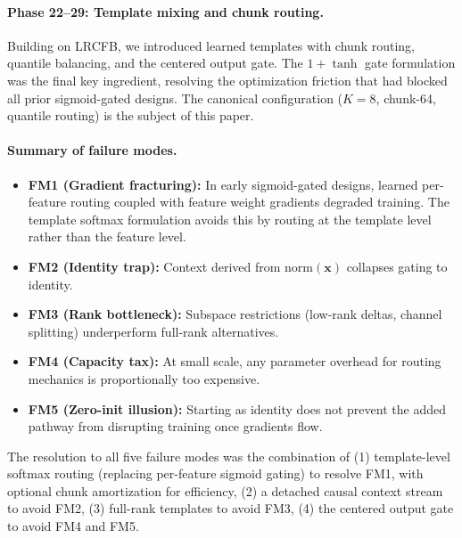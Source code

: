 \documentclass[11pt]{article}
\begin{document}
\paragraph{Phase 22--29: Template mixing and chunk routing.}
Building on LRCFB, we introduced learned templates with chunk routing, quantile balancing, and the centered output gate. The $1 + \tanh$ gate formulation was the final key ingredient, resolving the optimization friction that had blocked all prior sigmoid-gated designs. The canonical configuration ($K{=}8$, chunk-64, quantile routing) is the subject of this paper.

\paragraph{Summary of failure modes.}
\begin{itemize}
\item \textbf{FM1 (Gradient fracturing):} In early sigmoid-gated designs, learned per-feature routing coupled with feature weight gradients degraded training. The template softmax formulation avoids this by routing at the template level rather than the feature level.
\item \textbf{FM2 (Identity trap):} Context derived from $\text{norm}(\mathbf{x})$ collapses gating to identity.
\item \textbf{FM3 (Rank bottleneck):} Subspace restrictions (low-rank deltas, channel splitting) underperform full-rank alternatives.
\item \textbf{FM4 (Capacity tax):} At small scale, any parameter overhead for routing mechanics is proportionally too expensive.
\item \textbf{FM5 (Zero-init illusion):} Starting as identity does not prevent the added pathway from disrupting training once gradients flow.
\end{itemize}

The resolution to all five failure modes was the combination of (1) template-level softmax routing (replacing per-feature sigmoid gating) to resolve FM1, with optional chunk amortization for efficiency, (2) a detached causal context stream to avoid FM2, (3) full-rank templates to avoid FM3, (4) the centered output gate to avoid FM4 and FM5.
\end{document}
